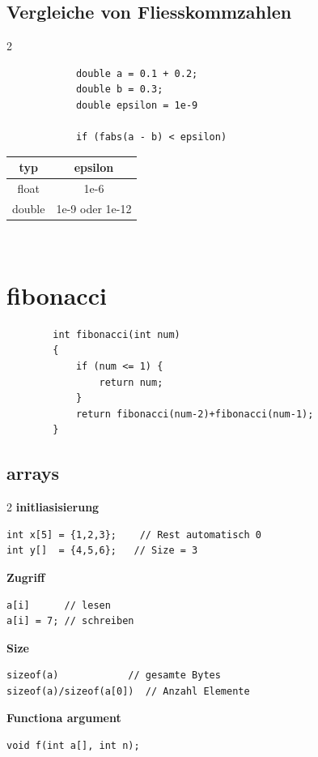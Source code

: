 \documentclass[a4paper,9pt]{article}
\begin{document}
    \subsection{Vergleiche von Fliesskommzahlen}
    \begin{multicols}{2}
        \begin{lstlisting}
            double a = 0.1 + 0.2;
            double b = 0.3;
            double epsilon = 1e-9
            
            if (fabs(a - b) < epsilon)
        \end{lstlisting}
        \begin{tabular}{|c|c|}
            \hline
            typ & epsilon \\
            \hline
            float & 1e-6 \\
            \hline
            double & 1e-9 oder 1e-12 \\
            \hline
        \end{tabular}\\
    \end{multicols}
    \section{fibonacci}
    \begin{lstlisting}
        int fibonacci(int num)
        {
            if (num <= 1) {
                return num;
            }
            return fibonacci(num-2)+fibonacci(num-1);
        }
    \end{lstlisting}
    \pagebreak
    \subsection{arrays}
    \begin{multicols}{2}
        \textbf{initliasisierung}
        \begin{lstlisting}
int x[5] = {1,2,3};    // Rest automatisch 0
int y[]  = {4,5,6};   // Size = 3
        \end{lstlisting}
        \textbf{Zugriff}
        \begin{lstlisting}
a[i]      // lesen
a[i] = 7; // schreiben
        \end{lstlisting}
        \textbf{Size}
        \begin{lstlisting}
sizeof(a)            // gesamte Bytes
sizeof(a)/sizeof(a[0])  // Anzahl Elemente
        \end{lstlisting}
        \textbf{Functiona argument}
        \begin{lstlisting}
void f(int a[], int n);
        \end{lstlisting}
    \end{multicols}
\end{document}
